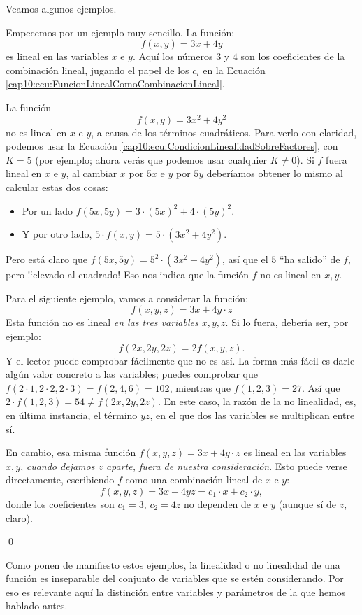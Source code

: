 Veamos algunos ejemplos.
\begin{ejemplo}
\label{cap10:ejem:EjemplosFuncionesLinealesYNoLineales}
Empecemos por un ejemplo muy sencillo. La función:
\[f(x,y)=3x+4y\]
es lineal en las variables $x$ e $y$. Aquí los números $3$ y $4$ son los coeficientes de la combinación lineal, jugando el papel de los $c_i$ en la Ecuación \ref{cap10:ecu:FuncionLinealComoCombinacionLineal}.

La función
\[f(x,y)=3x^2+4y^2\]
no es lineal en $x$ e $y$, a causa de los términos cuadráticos. Para verlo con claridad, podemos usar la Ecuación \ref{cap10:ecu:CondicionLinealidadSobreFactores}, con $K=5$ (por ejemplo; ahora verás que podemos usar cualquier $K\neq 0$). Si $f$ fuera lineal en $x$ e $y$, al cambiar $x$ por $5x$ e $y$ por $5y$ deberíamos obtener lo mismo al calcular estas dos cosas:
\begin{itemize}
  \item Por un lado $f(5x,5y)=3\cdot(5x)^2+4\cdot(5y)^2$.
  \item Y por otro lado, $5\cdot f(x,y)=5\cdot(3x^2+4y^2)$.
\end{itemize}
Pero está claro que $f(5x,5y)=5^2\cdot(3x^2+4y^2)$, así que el $5$ ``ha salido'' de $f$, pero {!`}elevado al cuadrado! Eso nos indica que la función $f$ no es lineal en $x,y$.

Para el siguiente ejemplo, vamos a considerar la función:
\[f(x,y,z)=3x+4y\cdot z\]
Esta función no es lineal {\em en las tres variables $x,y,z$}. Si lo fuera, debería ser, por ejemplo:
\[f(2x,2y,2z)=2f(x,y,z).\]
Y el lector puede comprobar fácilmente que no es así. La forma más fácil es darle algún valor concreto a las variables; puedes comprobar que $f(2\cdot 1,2\cdot 2,2\cdot 3)=f(2,4,6)=102$, mientras que $f(1,2,3)=27$. Así que $2\cdot f(1,2,3)=54\neq f(2x,2y,2z)$. En este caso, la razón de la no linealidad, es, en última instancia, el término $yz$, en el que dos las variables se multiplican entre sí.

En cambio, esa misma función $f(x,y,z)=3x+4y\cdot z$ es lineal en las variables $x,y$, {\em cuando dejamos $z$ aparte, fuera de nuestra consideración}. Esto puede verse directamente, escribiendo $f$ como una combinación lineal de $x$ e $y$:
\[f(x,y,z)= 3x+4yz= c_1\cdot x+c_2\cdot y,\]
donde los coeficientes son $c_1=3$, $c_2=4z$ no dependen de $x$ e $y$ (aunque sí de $z$, claro).

\qed
\end{ejemplo}

Como ponen de manifiesto estos ejemplos, la linealidad o no linealidad de una función es inseparable del conjunto de variables que se estén considerando. Por eso es relevante aquí la distinción entre variables y parámetros de la que hemos hablado antes.

